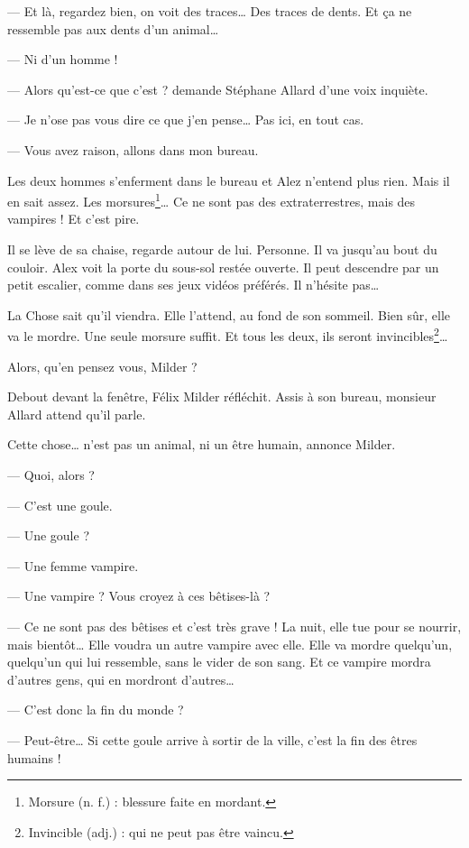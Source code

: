 --- Et là, regardez bien, on voit des traces\ldots{} Des traces de dents. Et \c{c}a ne ressemble pas aux dents d'un animal\ldots{}

--- Ni d'un homme !

--- Alors qu'est-ce que c'est ? demande Stéphane Allard d'une voix inquiète.

--- Je n'ose pas vous dire ce que j'en pense\ldots{} Pas ici, en tout cas.

--- Vous avez raison, allons dans mon bureau. \fg{}

Les deux hommes s'enferment dans le bureau et Alez n'entend plus rien. Mais il en sait assez. Les morsures\footnote{Morsure
(n. f.) : blessure faite en mordant.}\ldots{} Ce ne sont pas des extraterrestres, mais des vampires ! Et c'est pire.

Il se lève de sa chaise, regarde autour de lui. Personne. Il va jusqu'au bout du couloir. Alex voit la porte du sous-sol restée
ouverte. Il peut descendre par un petit escalier, comme dans ses jeux vidéos préférés. Il n'hésite pas\ldots{}

La Chose sait qu'il viendra. Elle l'attend, au fond de son sommeil. Bien sûr, elle va le mordre. Une seule morsure suffit. Et tous
les deux, ils seront invincibles\footnote{Invincible (adj.) : qui ne peut pas être vaincu.}\ldots{}

\og Alors, qu'en pensez vous, Milder ? \fg{}

Debout devant la fenêtre, Félix Milder réfléchit. Assis à son bureau, monsieur Allard attend qu'il parle.

\og Cette chose\ldots{} n'est pas un animal, ni un être humain, annonce Milder.

--- Quoi, alors ?

--- C'est une goule.

--- Une goule ?

--- Une femme vampire.

--- Une vampire ? Vous croyez à ces bêtises-là ?

--- Ce ne sont pas des bêtises et c'est très grave ! La nuit, elle tue pour se nourrir, mais bientôt\ldots{} Elle voudra un autre
    vampire avec elle. Elle va mordre quelqu'un, quelqu'un qui lui ressemble, sans le vider de son sang. Et ce vampire mordra
    d'autres gens, qui en mordront d'autres\ldots{}

--- C'est donc la fin du monde ?

--- Peut-être\ldots{} Si cette goule arrive à sortir de la ville, c'est la fin des êtres humains !

